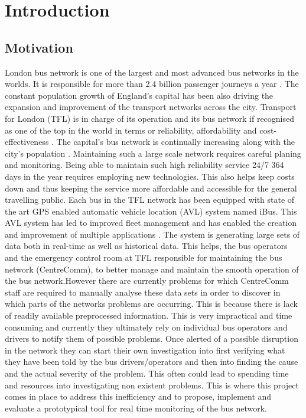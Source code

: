 \chapter{Introduction}

\section{Motivation}
London bus network is one of the largest and most advanced bus networks in the worlds. It is responsible for more than 2.4 billion passenger journeys a year \cite{TFL1}. The constant population growth of England's capital has been also driving the expansion and improvement of the transport networks across the city. Transport for London (TFL) is in charge of its operation and its bus network if recognised as one of the top in the world in terms or reliability, affordability and cost-effectiveness \cite{TFL1}. The capital's bus network is continually increasing along with the city's population \cite{TFL2}. 
Maintaining such a large scale network requires careful planing and monitoring. Being able to maintain such high reliability service 24/7 364 days in the year requires employing new technologies. This also helps keep costs down and thus keeping the service more affordable and accessible for the general travelling public. Each bus in the TFL network has been equipped with state of the art GPS enabled automatic vehicle location (AVL) system named iBus\cite{ibusdeployment}. This AVL system has led to improved fleet management and has enabled the creation and improvement of multiple applications \cite{eps354267}.
The system is generating large sets of data both in real-time as well as historical data. This helps, the bus operators and the emergency control room at TFL responsible for maintaining the bus network (CentreComm), to better manage and maintain the smooth operation of the bus network.However there are currently problems for which CentreComm staff are required to manually analyse these data sets in order to discover in which parts of the networks problems are occurring. This is because there is lack of readily available preprocessed information. This is very impractical and time consuming and currently they ultimately rely on individual bus operators and drivers to notify them of possible problems. Once alerted of a possible disruption in the network they can start their own investigation into first verifying what they have been told by the bus drivers/operators and then into finding the cause and the actual severity of the problem. This often could lead to spending time and resources into investigating non existent problems. This is where this project comes in place to address this inefficiency and to propose, implement and evaluate a prototypical tool for real time monitoring of the bus network.

